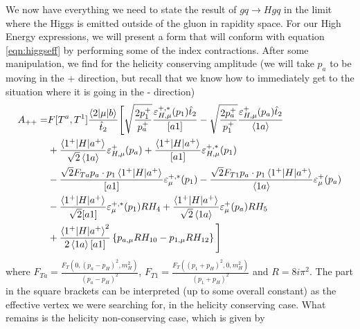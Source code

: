 We now have everything we need to state the result of $gq \to Hgq$ in the limit where the Higgs is emitted outside of the gluon in rapidity space. For our High Energy expressions, we will present a form that will conform with equation \ref{eqn:higgseff} by performing some of the index contractions. After some manipulation, we find for the helicity conserving amplitude (we will take $p_a$ to be moving in the + direction, but recall that we know how to immediately get to the situation where it is going in the - direction)
\begin{equation}
\begin{split}
A_{++} =& F[T^a,T^1]\frac{\mathinner{\langle2\vert\mu\vert b\rangle}_{}}{\hat{t}_2} \Bigg[\sqrt{\frac{2p_1^+}{p_a^+}}\frac{\varepsilon_{H,\mu}^{+,*}(p_1) \hat{t}_2}{[a1]} - \sqrt{\frac{2p_a^+}{p_1^+}}\frac{\varepsilon_{H,\mu}^{+}(p_a)\hat{t}_2}{ \left<1 a \right>} \\
&+ \frac{\mathinner{\langle1^+\vert H\vert a^+\rangle}_{}}{\sqrt{2}\left<1 a \right>}\varepsilon_{H,\mu}^+(p_a) + \frac{\mathinner{\langle1^+\vert H\vert a^+\rangle}_{}}{[a 1]}\varepsilon^{+,*}_{H,\mu}(p_1) \\
&- \frac{\sqrt{2} F_{Ta} p_a \cdot p_1 \mathinner{\langle1^+\vert H\vert a^+\rangle}_{}}{[a1]}\varepsilon^{+,*}_\mu (p_1) - \frac{\sqrt{2} F_{T1} p_a \cdot p_1 \mathinner{\langle1^+\vert H\vert a^+\rangle}_{}}{\left<1 a \right>}\varepsilon^+_\mu (p_a)  \\ 
& -\frac{\mathinner{\langle1^+\vert H\vert a^+\rangle}_{}}{\sqrt{2} [a1]} \varepsilon^{+,*}_\mu(p_1) R H_4 + \frac{\mathinner{\langle1^+\vert H\vert a^+\rangle}_{}}{\sqrt{2} \left <1 a \right>} \varepsilon^{+}_\mu(p_a)R H_5 \\
 & + \frac{\mathinner{\langle1^+\vert H\vert a^+\rangle}_{}^2}{2 \left<1 a \right> [a 1]}\left \{ p_{a,\mu} R H_{10} - p_{1,\mu}RH_{12}\right \} \Bigg]
\end{split}
\end{equation}
where $F_{Ta} = \frac{F_T(0,(p_a-p_H)^2,m_H^2)}{(p_a-p_H)^2}$,  $F_{T1} = \frac{F_T((p_1+p_H)^2, 0, m_H^2)}{(p_1+p_H)^2}$ and $R = 8 i \pi^2$. The part in the square brackets can be interpreted (up to some overall constant) as the effective vertex we were searching for, in the helicity conserving case. What remains is the helicity non-conserving case, which is given by
